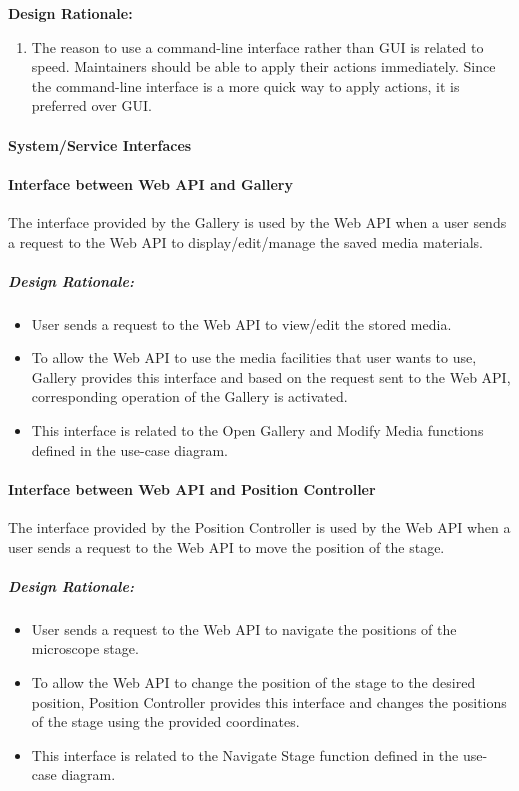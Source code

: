 	\textbf{Design Rationale:} 
	\begin{enumerate}
		\item The reason to use a command-line interface rather than GUI is related to speed. Maintainers should be able to apply their actions immediately. Since the command-line interface is a more quick way to apply actions, it is preferred over GUI.
	\end{enumerate}
	\paragraph{System/Service Interfaces}
	\paragraph{Interface between Web API and Gallery}
	The interface provided by the Gallery is used by the Web API when a user sends a request to the Web API to display/edit/manage the saved media materials.
	\subparagraph{Design Rationale:}
	\begin{itemize}
		\item User sends a request to the Web API to view/edit the stored media.
		\item To allow the Web API to use the media facilities that user wants to use, Gallery provides this interface and based on the request sent to the Web API, corresponding operation of the Gallery is activated.
		\item This interface is related to the Open Gallery and Modify Media functions defined in the use-case diagram.
	\end{itemize}
	\paragraph{Interface between Web API and Position Controller}
	The interface provided by the Position Controller is used by the Web API when a user sends a request to the Web API to move the position of the stage.
	\subparagraph{Design Rationale:}
	\begin{itemize}
		\item User sends a request to the Web API to navigate the positions of the microscope stage.
		\item To allow the Web API to change the position of the stage to the desired position, Position Controller provides this interface and changes the positions of the stage using the provided coordinates.
		\item This interface is related to the Navigate Stage function defined in the use-case diagram.
	\end{itemize}
